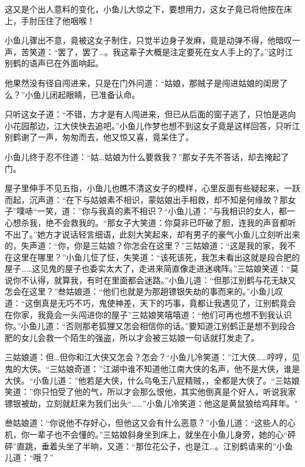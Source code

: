 \documentclass[12pt,oneside]{book}
\begin{document}
这又是个出人意料的变化，小鱼儿大惊之下，要想用力，这女子竟已将他按在床上，手肘压住了他咽喉！

小鱼儿骤出不意，竟被这女子制住，只觉半边身子发麻，竟是动弹不得，他暗叹一声，苦笑道：``罢了，罢了\ldots。我这辈子大概是注定要死在女人手上的了。''这时江别鹤的语声已在外面响起。

他果然没有径自闯进来，只是在门外问道：``姑娘，那贼子是闯进姑娘的闺房了么？''小鱼儿闭起眼睛，已准备认命。

只听这女子道：``不错，方才是有人闯进来，但已从后面的窗子逃了，只怕是逃向小花园那边，江大侠快去追吧。''小鱼儿作梦也想不到这女子竟是这样回答，只听江别鹤谢了一声，匆匆而去，他又惊又喜，竟呆住了。

小鱼儿终于忍不住道：``姑\ldots 姑娘为什么要救我？''那女子先不答话，却去掩起了门。

屋子里伸手不见五指，小鱼儿也瞧不清这女子的模样，心里反面有些疑起来，一跃而起，沉声道：``在下与姑娘素不相识，蒙姑娘出手相救，却不知是何缘故？那女子''噗哧``一笑，道：''你与我真的素不相识？``小鱼儿道：''与我相识的女人，都一心想杀我，绝不会救我的。``那女子大笑道：你莫非已吓破了胆，连我的声音都听不出了。''她方才说话轻言细语，此刻大笑起来，却有男子的豪气小鱼儿立刻听出来的，失声道：``你，你是三姑娘？你怎会在这里？''三姑娘道：``这是我的家，我不在这里在哪里？''小鱼儿怔了怔，失笑道：``该死该死，我怎未看出这就是段合肥的屋子\ldots\ldots 这见鬼的屋子也委实太大了，走进来简直像走进迷魂阵。''三姑娘笑道：``莫说你不认得，就算我，有时在里面都会迷路。''小鱼儿道：``但那江别鹤与花无缺又怎会在这里？''叁姑娘道：``他们也就是为那趟镖银失劫的事而来的。''小鱼儿叹道：``这倒真是无巧不巧，鬼使神差，天下的巧事，竟都让我遇见了，江别鹤竟会在你家，我竟会一头闯进你的屋子''三姑娘笑嘻嘻道：``他们可再也想不到我认识你。''小鱼儿道：``否则那老狐狸又怎会相信你的话。''要知道江别鹤正是想不到段合肥的女儿会救一个陌生的强盗，所以才会被三姑娘一句话就打发走了。

三姑娘道：但\ldots 但你和江大侠又怎会？怎会？``小鱼儿冷笑道：''江大侠\ldots\ldots 哼哼，见鬼的大侠。``三姑娘奇道：''江湖中谁不知道他江南大侠的名声，他不是大侠，谁是大侠。``小鱼儿道：''他若是大侠，什么乌龟王八屁精贼，，全都是大侠了。``三姑娘笑道：''你只怕受了他的气，所以才会那么恨他，其实他倒真是个好人，听说我家镖银被劫，立刻就赶来为我们出头``\ldots\ldots{}''小鱼儿冷笑道：他这是黄鼠狼给鸡拜年。"

叁姑娘道：``你说他不存好心，但他这又会有什么恶意？''小鱼儿道：``这些人的心机，你一辈子也不会懂的。''三姑娘斜身坐到床上，就坐在小鱼儿身旁，她的心``砰砰''直跳，垂着头坐了半晌，又道：``那位花公子，也是江\ldots。江别鹤请来的''小鱼儿道：``哦？''
\end{document}
